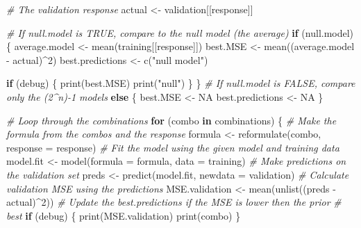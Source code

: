 \documentclass[
]{article}
\newenvironment{Shaded}{\begin{snugshade}}{\end{snugshade}}
\newcommand{\AttributeTok}[1]{\textcolor[rgb]{0.77,0.63,0.00}{#1}}
\newcommand{\CommentTok}[1]{\textcolor[rgb]{0.56,0.35,0.01}{\textit{#1}}}
\newcommand{\ConstantTok}[1]{\textcolor[rgb]{0.00,0.00,0.00}{#1}}
\newcommand{\ControlFlowTok}[1]{\textcolor[rgb]{0.13,0.29,0.53}{\textbf{#1}}}
\newcommand{\DecValTok}[1]{\textcolor[rgb]{0.00,0.00,0.81}{#1}}
\newcommand{\FunctionTok}[1]{\textcolor[rgb]{0.00,0.00,0.00}{#1}}
\newcommand{\NormalTok}[1]{#1}
\newcommand{\OtherTok}[1]{\textcolor[rgb]{0.56,0.35,0.01}{#1}}
\newcommand{\SpecialCharTok}[1]{\textcolor[rgb]{0.00,0.00,0.00}{#1}}
\newcommand{\StringTok}[1]{\textcolor[rgb]{0.31,0.60,0.02}{#1}}
\begin{document}
\begin{Shaded}
\begin{Highlighting}[]
  \CommentTok{\# The validation response}
\NormalTok{  actual }\OtherTok{\textless{}{-}}\NormalTok{ validation[[response]]}
  
  \CommentTok{\# If null.model is TRUE, compare to the null model (the average)}
  \ControlFlowTok{if}\NormalTok{ (null.model) \{}
\NormalTok{    average.model }\OtherTok{\textless{}{-}} \FunctionTok{mean}\NormalTok{(training[[response]])}
\NormalTok{    best.MSE }\OtherTok{\textless{}{-}} \FunctionTok{mean}\NormalTok{((average.model }\SpecialCharTok{{-}}\NormalTok{ actual)}\SpecialCharTok{\^{}}\DecValTok{2}\NormalTok{)}
\NormalTok{    best.predictions }\OtherTok{\textless{}{-}} \FunctionTok{c}\NormalTok{(}\StringTok{"null model"}\NormalTok{)}
    
    \ControlFlowTok{if}\NormalTok{ (debug) \{}
      \FunctionTok{print}\NormalTok{(best.MSE)}
      \FunctionTok{print}\NormalTok{(}\StringTok{"null"}\NormalTok{)}
\NormalTok{    \}}
\NormalTok{  \}}
  \CommentTok{\# If null.model is FALSE, compare only the (2\^{}n){-}1 models}
  \ControlFlowTok{else}\NormalTok{ \{}
\NormalTok{    best.MSE }\OtherTok{\textless{}{-}} \ConstantTok{NA}
\NormalTok{    best.predictions }\OtherTok{\textless{}{-}} \ConstantTok{NA}
\NormalTok{  \}}
  
  
  \CommentTok{\# Loop through the combinations}
  \ControlFlowTok{for}\NormalTok{ (combo }\ControlFlowTok{in}\NormalTok{ combinations) \{}
    \CommentTok{\# Make the formula from the combos and the response}
\NormalTok{    formula }\OtherTok{\textless{}{-}} \FunctionTok{reformulate}\NormalTok{(combo, }\AttributeTok{response =}\NormalTok{ response)}
    \CommentTok{\# Fit the model using the given model and training data}
\NormalTok{    model.fit }\OtherTok{\textless{}{-}} \FunctionTok{model}\NormalTok{(}\AttributeTok{formula =}\NormalTok{ formula, }\AttributeTok{data =}\NormalTok{ training)}
    \CommentTok{\# Make predictions on the validation set}
\NormalTok{    preds }\OtherTok{\textless{}{-}} \FunctionTok{predict}\NormalTok{(model.fit, }\AttributeTok{newdata =}\NormalTok{ validation)}
    \CommentTok{\# Calculate validation MSE using the predictions}
\NormalTok{    MSE.validation }\OtherTok{\textless{}{-}} \FunctionTok{mean}\NormalTok{(}\FunctionTok{unlist}\NormalTok{((preds }\SpecialCharTok{{-}}\NormalTok{ actual)}\SpecialCharTok{\^{}}\DecValTok{2}\NormalTok{))}
    \CommentTok{\# Update the best.predictions if the MSE is lower then the prior }
      \CommentTok{\# best}
    \ControlFlowTok{if}\NormalTok{ (debug) \{}
      \FunctionTok{print}\NormalTok{(MSE.validation)}
      \FunctionTok{print}\NormalTok{(combo)}
\NormalTok{    \}}
    

\end{Highlighting}
\end{Shaded}
\end{document}
